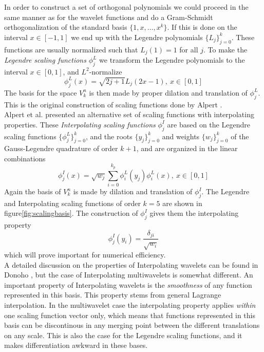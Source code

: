 \noindent
In order to construct a set of orthogonal polynomials we could proceed in the
same manner as for the wavelet functions and do a Gram-Schmidt
orthogonalization of the standard basis $\lbrace 1, x, \dots, x^k\rbrace$. 
If this is done on the interval $x \in [-1,1]$ we end up with the Legendre
polynomials $\lbrace L_j\rbrace_{j=0}^k$. These functions are usually 
normalized such that $L_j(1) = 1$ for all $j$. To
make the \emph{Legendre scaling functions} $\phi_j^L$ we transform the Legendre
polynomials to the interval $x \in [0,1]$, and $L^2$-normalize
\begin{equation}
	\phi_j^L(x) = \sqrt{2j+1}L_j(2x-1),\ x \in [0,1]
\end{equation}
The basis for the space $V^n_k$ is then made by proper dilation and 
translation of $\phi_j^L$. This is the original construction of scaling 
functions done by Alpert \cite{Alpert93}.\\

\noindent
Alpert et al. \cite{Alpert02} presented an alternative set of scaling functions 
with interpolating properties. These \emph{Interpolating scaling functions} 
$\phi_j^I$ are based on the Legendre scaling functions $\lbrace \phi_j^L
\rbrace_{j=0}^k$, and the roots $\lbrace y_j\rbrace_{j=0}^k$ and weights
$\lbrace w_j \rbrace_{j=0}^k$ of the Gauss-Legendre quadrature of order 
$k+1$, and are organized in the linear combinations
\begin{equation}
	\label{eq:interpolating}
	\phi_j^I(x) = \sqrt{w_j}\sum_{i=0}^{k_p} \phi_i^L(y_j)\phi_i^L(x)
																,\ x \in [0,1]
\end{equation}
Again the basis of $V^n_k$ is made by dilation and translation of $\phi_j^I$.
The Legendre and Interpolating scaling functions of order $k=5$ are shown in 
figure\ref{fig:scalingbasis}.
The construction of $\phi_j^I$ gives them the interpolating property
\begin{equation}
	\label{eq:interprop}
	\phi_j^I(y_i) = \frac{\delta_{ji}}{\sqrt{w_i}}
\end{equation}
which will prove important for numerical efficiency.\\

\noindent
A detailed discussion on the properties of Interpolating wavelets can be found
in Donoho \cite{Donoho}, but the case of Interpolating multiwavelets is
somewhat different. An important property of Interpolating wavelets is the
\emph{smoothness} of any function represented in this basis. This property
stems from general Lagrange interpolation. In the multiwavelet case the 
interpolating property applies \emph{within} one scaling function vector
only, which means that functions represented in this basis can be discontinous
in any merging point between the different translations on any scale. This is
also the case for the Legendre scaling functions, and it makes differentiation 
awkward in these bases.\\

